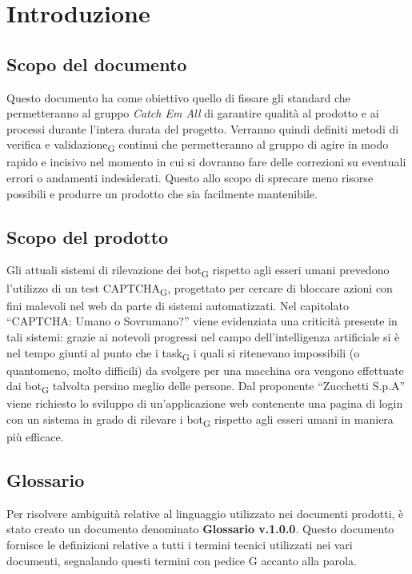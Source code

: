 \section{Introduzione}

\subsection{Scopo del documento}
Questo documento ha come obiettivo quello di fissare gli standard che permetteranno al gruppo \textit{Catch Em All} di garantire qualità al prodotto e ai processi durante l'intera durata del progetto. Verranno quindi definiti metodi di verifica e validazione\textsubscript{G} continui che permetteranno al gruppo di agire in modo rapido e incisivo nel momento in cui si dovranno fare delle correzioni su eventuali errori o andamenti indesiderati. Questo allo scopo di sprecare meno risorse possibili e produrre un prodotto che sia facilmente mantenibile. 

\subsection{Scopo del prodotto}
Gli attuali sistemi di rilevazione dei bot\textsubscript{G} rispetto agli esseri umani prevedono l'utilizzo di un test CAPTCHA\textsubscript{G}, progettato per cercare di bloccare azioni con fini malevoli nel web da parte di sistemi automatizzati. Nel capitolato “CAPTCHA: Umano o Sovrumano?” viene evidenziata una criticità presente in tali sistemi: grazie ai notevoli progressi nel campo dell’intelligenza artificiale si è nel tempo giunti al punto che i task\textsubscript{G} i quali si ritenevano impossibili (o quantomeno, molto difficili) da svolgere per una macchina ora vengono effettuate dai bot\textsubscript{G} talvolta persino meglio delle persone.
Dal proponente “Zucchetti S.p.A” viene richiesto lo sviluppo di un'applicazione web contenente una pagina di login con un sistema in grado di rilevare i bot\textsubscript{G} rispetto agli esseri umani in maniera più efficace.

\subsection{Glossario}
Per risolvere ambiguità relative al linguaggio utilizzato nei documenti prodotti, è stato creato un documento denominato \textbf{Glossario v.1.0.0}. Questo documento fornisce le definizioni relative a tutti i termini tecnici utilizzati nei vari documenti, segnalando questi termini con pedice G accanto alla parola.

